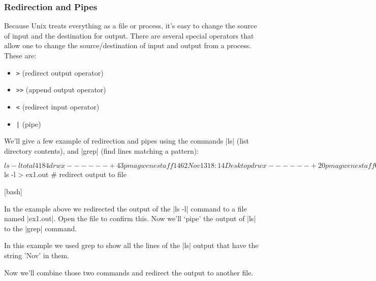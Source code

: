 \subsubsection{Redirection and Pipes}

Because Unix treats everything as a file or process, it's easy to change the source of input and the destination for output. There are several special operators that allow one to change the source/destination of input and output from a process. These are:

\begin{itemize}
    \item \verb=>= (redirect output operator)
    \item \verb=>>= (append output operator)
    \item \verb=<= (redirect input operator)
    \item \verb=|= (pipe)
\end{itemize}

We'll give a few example of redirection and pipes using the commands |ls| (list directory contents), and |grep| (find lines matching a pattern):

\begin{tinycode}[bash]
$ ls -l
total 4184
drwx------+   43 pmagwene  staff     1462 Nov 13 18:14 Desktop
drwx------+   20 pmagwene  staff      680 Sep 23 12:32 Documents
... output truncated ...
$ ls -l > ex1.out # redirect output to file
\end{tinycode}[bash]

In the example above we redirected the output of the |ls -l| command to a file named |ex1.out|.  Open the file to confirm this.  Now we'll `pipe' the output of |ls| to the |grep| command.


In this example we used grep to show all the lines of the |ls| output that have the string 'Nov' in them.

Now we'll combine those two commands and redirect the output to another file.

